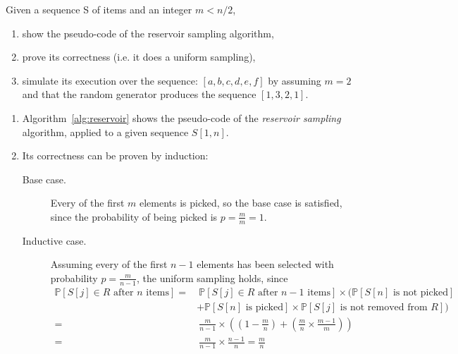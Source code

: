 \exercise

Given a sequence S of items and an integer $m < n/2$,
%
\begin{enumerate}
  \item show the pseudo-code of the reservoir sampling algorithm,
  \item prove its correctness (i.e. it does a uniform sampling),
  \item simulate its execution over the sequence: $[a, b, c, d, e, f]$ by
  assuming $m=2$ and that the random generator produces the sequence $[1, 3, 2,
  1]$.
\end{enumerate}

\solution

\begin{enumerate}

  \item Algorithm~\ref{alg:reservoir} shows the pseudo-code of the
  \emph{reservoir sampling} algorithm, applied to a given sequence $S[1, n]$.

  \item Its correctness can be proven by induction:
  \begin{description}

    \item[Base case.] Every of the first $m$ elements is picked, so the base
    case is satisfied, since the probability of being picked is $p =
    \frac{m}{m} = 1$.

    \item[Inductive case.] Assuming every of the first $n - 1$ elements has been
    selected with probability $p = \frac{m}{n - 1}$, the uniform sampling
    holds, since
    \begin{align*}
      \mathbb{P}\left[ S[j] \in R \text{ after } n \text{ items} \right] =&\
      \mathbb{P}\left[ S[j] \in R \text{ after } n - 1 \text{ items} \right]
      \times \Big( \mathbb{P}\left[ S[n] \text{ is not picked} \right] \\
      & + \mathbb{P}\left[ S[n] \text{ is picked} \right] \times
      \mathbb{P}\left[ S[j] \text{ is not removed from } R \right] \Big)\\
      =&\ \frac{m}{n - 1} \times \left( \left(1 - \frac{m}{n} \right) +
      \left(\frac{m}{n} \times \frac{m - 1}{m} \right)\right) \\
      =&\ \frac{m}{n - 1} \times \frac{n - 1}{n} = \frac{m}{n}
    \end{align*}

  \end{description}


\end{enumerate}
